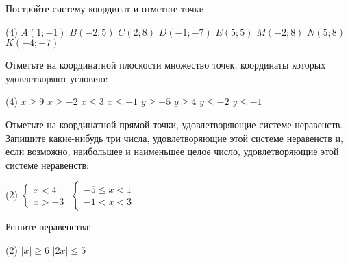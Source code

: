 \begin{homework}[number=2]
	\begin{listofex}
		\item Постройте систему координат и отметьте точки
		\begin{tasks}(4)
			\task \( A(1;-1) \)
			\task \( B(-2;5) \)
			\task \( C(2;8) \)
			\task \( D(-1;-7) \)
			\task \( E(5;5) \)
			\task \( M(-2;8) \)
			\task \( N(5;8) \)
			\task \( K(-4;-7) \)
		\end{tasks}
		\item Отметьте на координатной плоскости множество точек, координаты которых удовлетворяют условию:
		\begin{tasks}(4)
			\task \( x \ge 9 \)
			\task \( x \ge -2 \)
			\task \( x \le 3 \)
			\task \( x \le -1 \)
			\task \( y \ge -5 \)
			\task \( y \ge 4 \)
			\task \( y \le -2 \)
			\task \( y \le -1 \)
		\end{tasks}
		\item Отметьте на координатной прямой точки, удовлетворяющие системе неравенств. Запишите какие-нибудь три числа, удовлетворяющие этой системе неравенств и, если возможно, наибольшее и наименьшее целое число, удовлетворяющие этой системе неравенств:
		\begin{tasks}(2)
			\task \( \begin{cases} x<4 \\ x>-3 \end{cases} \)
			\task \( \begin{cases} -5 \le x < 1 \\ -1 < x < 3 \end{cases} \)
		\end{tasks}
		\item Решите неравенства:
		\begin{tasks}(2)
			\task \( |x| \ge 6 \)
			\task \( |2x| \le 5 \)
		\end{tasks}
	\end{listofex}
\end{homework}

